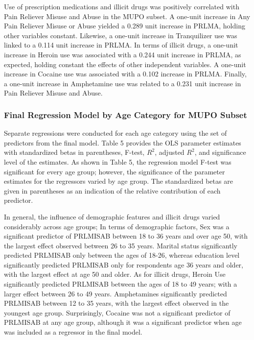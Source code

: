 \documentclass[sigconf]{acmart}
\begin{document}
Use of prescription medications and illicit drugs was positively correlated with 
Pain Reliever Misuse and Abuse in the MUPO subset. A one-unit increase in Any 
Pain Reliever Misuse or Abuse yielded a 0.289 unit increase in PRLMA, holding 
other variables constant. Likewise, a one-unit increase in Tranquilizer use was 
linked to a 0.114 unit increase in PRLMA. In terms of illicit drugs, a one-unit 
increase in Heroin use was associated with a 0.244 unit increase in PRLMA, as 
expected, holding constant the effects of other independent variables. 
A one-unit increase in Cocaine use was associated with a 0.102 increase in PRLMA. 
Finally, a one-unit increase in Amphetamine use was related to a 0.231 unit 
increase in Pain Reliever Misuse and Abuse.  


\subsubsection{Final Regression Model by Age Category for MUPO Subset}

Separate regressions were conducted for each age category using the set of
predictors from the final model. Table 5 provides the OLS parameter estimates 
with standardized betas in parentheses, F-test, $R^2$, adjusted $R^2$, and 
significance level of the estimates. As shown in Table 5, the regression 
model F-test was significant for every age group; however, the significance
of the parameter estimates for the regressors varied by age group. The 
standardized betas are given in parentheses as an indication of the relative 
contribution of each predictor. 

In general, the influence of demographic features and illicit drugs varied 
considerably across age groups; In terms of demographic factors, Sex was a 
significant predictor of PRLMISAB between 18 to 36 years and over age 50, with
the largest effect observed between 26 to 35 years. Marital status 
significantly predicted PRLMISAB only between the ages of 18-26, whereas 
education level significantly predicted PRLMISAB only for respondents age 
36 years and older, with the largest effect at age 50 and older. As for 
illicit drugs, Heroin Use significantly predicted PRLMISAB between the ages 
of 18 to 49 years; with a larger effect between 26 to 49 years. Amphetamines 
significantly predicted PRLMISAB between 12 to 35 years, with the largest 
effect observed in the youngest age group. Surprisingly, Cocaine was not
a significant predictor of PRLMISAB at any age group, although it was a 
significant predictor when age was included as a regressor in the final model. 
\end{document}
